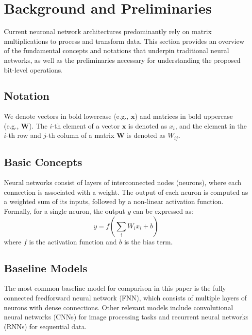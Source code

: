 \section{Background and Preliminaries}\label{sec:background}

Current neuronal network architectures predominantly rely on matrix multiplications to process and transform data. This section provides an overview of the fundamental concepts and notations that underpin traditional neural networks, as well as the preliminaries necessary for understanding the proposed bit-level operations.

\subsection{Notation}
We denote vectors in bold lowercase (e.g., \(\mathbf{x}\)) and matrices in bold uppercase (e.g., \(\mathbf{W}\)). The \(i\)-th element of a vector \(\mathbf{x}\) is denoted as \(x_i\), and the element in the \(i\)-th row and \(j\)-th column of a matrix \(\mathbf{W}\) is denoted as \(W_{ij}\).

\subsection{Basic Concepts}
Neural networks consist of layers of interconnected nodes (neurons), where each connection is associated with a weight. The output of each neuron is computed as a weighted sum of its inputs, followed by a non-linear activation function. Formally, for a single neuron, the output \(y\) can be expressed as:
\[
y = f\left(\sum_{i} W_{i} x_{i} + b\right)
\]
where \(f\) is the activation function and \(b\) is the bias term.

\subsection{Baseline Models}
The most common baseline model for comparison in this paper is the fully connected feedforward neural network (FNN), which consists of multiple layers of neurons with dense connections. Other relevant models include convolutional neural networks (CNNs) for image processing tasks and recurrent neural networks (RNNs) for sequential data.
